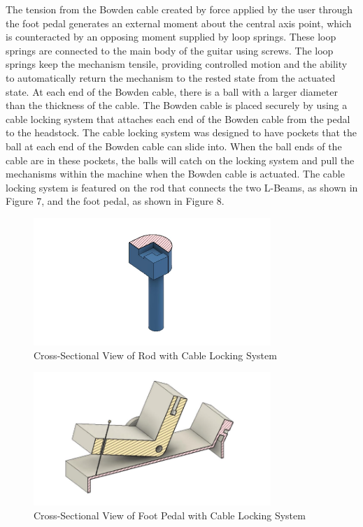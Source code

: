 \documentclass[12pt]{article}
\theoremstyle{definition} %
\theoremstyle{plain} %
\begin{document}
The tension from the Bowden cable created by force applied by the user through the foot
pedal generates an external moment about the central axis point, which is counteracted by an
opposing moment supplied by loop springs. These loop springs are connected to the main body of
the guitar using screws. The loop springs keep the mechanism tensile, providing controlled motion
and the ability to automatically return the mechanism to the rested state from the actuated state. At
each end of the Bowden cable, there is a ball with a larger diameter than the thickness of the cable.
The Bowden cable is placed securely by using a cable locking system that attaches each end of the
Bowden cable from the pedal to the headstock. The cable locking system was designed to have
pockets that the ball at each end of the Bowden cable can slide into. When the ball ends of the cable
are in these pockets, the balls will catch on the locking system and pull the mechanisms within the
machine when the Bowden cable is actuated. The cable locking system is featured on the rod that
connects the two L-Beams, as shown in Figure 7, and the foot pedal, as shown in Figure 8.

\begin{figure}[htbp]
  \centering
  \includegraphics[width=0.8\textwidth]{fgs/fig7.png}
  \caption{Cross-Sectional View of Rod with Cable Locking System}
  \label{fig:}
\end{figure}

\begin{figure}[htbp]
  \centering
  \includegraphics[width=0.8\textwidth]{fgs/fig8.png}
  \caption{Cross-Sectional View of Foot Pedal with Cable Locking System}
  \label{fig:}
\end{figure}
\end{document}
